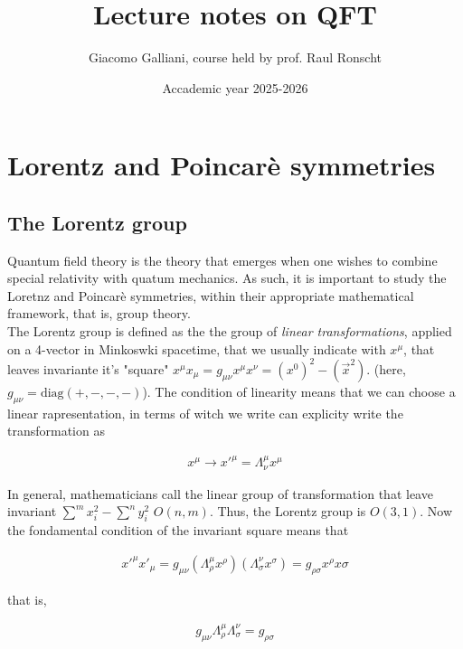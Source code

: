 \documentclass{report}
\title{\Huge{\textbf{Lecture notes on QFT}}}
\author{Giacomo Galliani, course held by  prof. Raul Ronscht}
\date{Accademic year 2025-2026}
\renewcommand{\contentsname}{Indice}
\begin{document}
\maketitle
\newpage%
\pdfbookmark[section]{\contentsname}{toc}
\tableofcontents
\pagebreak

\chapter{Lorentz and Poincarè symmetries}

\section{The Lorentz group}

Quantum field theory is the theory that emerges when one wishes to combine special relativity with quatum mechanics. As such, it is important to study the Loretnz and Poincarè symmetries, within their appropriate mathematical framework, that is, group theory. \\


The Lorentz group is defined as the the group of \emph{linear transformations}, applied on a 4-vector in Minkoswki spacetime, that we usually indicate with \(x^\mu\), that leaves invariante it's "square" \(x^\mu x_\mu = g_{\mu\nu}x^{\mu}x^{\nu} = (x^0)^2 - (\vec{x}^2)\). (here, \(g_{\mu\nu} = \text{diag}(+, -, -, -)\)). The condition of linearity means that we can choose a linear rapresentation, in terms of witch we write can explicity write the transformation as 

\begin{align}
    x^\mu \rightarrow x'^\mu = \Lambda^{\mu}_\nu x^{\mu}
\end{align}

In general, mathematicians call the linear group of transformation that leave invariant \(\sum^m x_i^2 - \sum^n y_i^2\) \(O(n,m)\). Thus, the Lorentz group is \(O(3, 1)\). Now the fondamental condition of the invariant square means that 

\begin{align}
    x'^\mu x'_\mu = g_{\mu\nu}(\Lambda^\mu_\rho x^\rho)(\Lambda^\nu_\sigma x^\sigma) = g_{\rho \sigma}x^\rho x\sigma
\end{align}

that is, 

\begin{align}
    g_{\mu\nu}\Lambda^\mu_\rho \Lambda^\nu_\sigma = g_{\rho\sigma}
\end{align}
\end{document}
